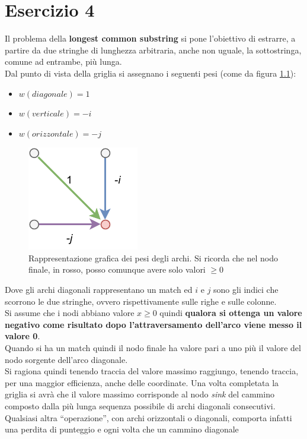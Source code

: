 \documentclass[a4paper,12pt, oneside]{book}
\begin{document}
\chapter{Esercizio 4}
Il problema della \textbf{longest common substring} si pone l'obiettivo di
estrarre, a partire da due stringhe di lunghezza arbitraria, anche non uguale,
la sottostringa, comune ad entrambe, più lunga.\\
Dal punto di vista della griglia si assegnano i seguenti pesi (come da figura
\ref{fig:pes4}): 
\begin{itemize}
  \item $w(diagonale)=1$
  \item $w(verticale)=-i$
  \item $w(orizzontale)=-j$
\end{itemize}
\begin{figure}
  \centering
  \includegraphics[scale = 1.3]{img/es41.pdf}
  \caption{Rappresentazione grafica dei pesi degli archi. Si ricorda che nel
    nodo finale, in rosso,
    posso comunque avere solo valori $\geq 0$}
  \label{fig:pes4}
\end{figure}
Dove gli archi diagonali rappresentano un match ed $i$ e $j$ sono gli indici che
scorrono le due stringhe, ovvero rispettivamente sulle righe e sulle colonne.\\
Si assume che i nodi abbiano valore $x\geq 0$ quindi
\textbf{qualora si ottenga un valore negativo come risultato dopo
  l'attraversamento dell'arco viene messo il valore 0}.\\
Quando si ha un match quindi il nodo finale ha valore pari a uno più il valore
del nodo sorgente dell'arco diagonale.\\
Si ragiona quindi tenendo traccia del valore massimo raggiungo, tenendo traccia,
per una maggior efficienza, anche delle coordinate. Una volta completata la
griglia si avrà che il valore massimo corrisponde al nodo \textit{sink} del
cammino composto dalla più lunga sequenza possibile di archi diagonali
consecutivi. Qualsiasi altra ``operazione'', con archi orizzontali o diagonali,
comporta infatti una perdita di punteggio e ogni volta che un cammino diagonale
\end{document}
